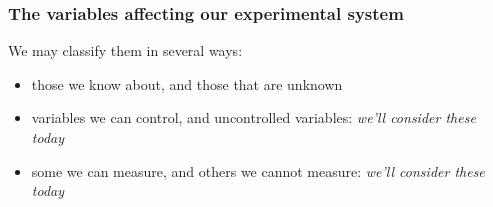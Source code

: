 \begin{comment}
\begin{frame}\frametitle{Cellphone app example: test your understanding}
	
	
	Are these ``disturbances'' (\emph{not measured, not controlled}), or \\
	\qquad\quad\,\,\,\,\,\, ``covariates'' \,\,\,\, (\emph{measured, but not controlled}), or \\
	\qquad\quad\,\,\,\,\,\, ``neither of these'':
	
	\vspace{0.5cm}
	
	\begin{itemize}
		\item	\textbf{E}: smartphone user's age
		\item	\textbf{N}: smartphone user's gender
		\item	\textbf{S}: smartphone user's connection speed (e.g. cell, or wifi)
		\item	\textbf{R}: amount of free memory (RAM) on the device
		\item	\textbf{F}: whether the advert/message is delivered via ad network G, or ad network H
		\item	\textbf{D}: if the user's phone is Android or Apple		
	\end{itemize}
	
	\vspace{0.5cm}
	
	Participate in the forums and share your opinion at \href{http://tiny.cc/cal-app}{http://tiny.cc/cal-app}
\end{frame}

\end{comment}

\begin{frame}\frametitle{The variables affecting our experimental system}
	We may classify them in several ways:
	
	\begin{itemize}
		\item	those we know about, and those that are unknown
			\pause
		\item	variables we can control, and uncontrolled variables: \emph{we'll consider these today}
			\pause
		\item	some we can measure, and others we cannot measure: \emph{we'll consider these today}
		
	\end{itemize}	
\end{frame}

